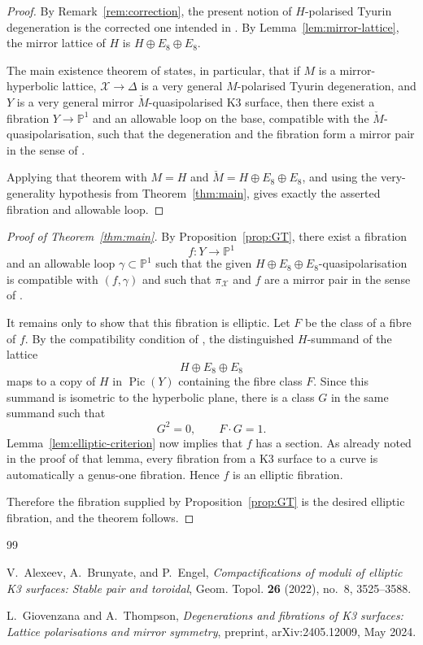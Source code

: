 \documentclass[11pt]{article}
\newcommand{\PP}{\mathbb{P}}
\newcommand{\Pic}{\operatorname{Pic}}
\begin{document}
\begin{proof}
By Remark~\ref{rem:correction}, the present notion of $H$-polarised Tyurin degeneration is the corrected one intended in \cite{GT24}. By Lemma~\ref{lem:mirror-lattice}, the mirror lattice of $H$ is $H\oplus E_8\oplus E_8$.

The main existence theorem of \cite[\S5]{GT24} states, in particular, that if $M$ is a mirror-hyperbolic lattice, $\mathcal X\to \Delta$ is a very general $M$-polarised Tyurin degeneration, and $Y$ is a very general mirror $\check M$-quasipolarised K3 surface, then there exist a fibration $Y\to \PP^1$ and an allowable loop on the base, compatible with the $\check M$-quasipolarisation, such that the degeneration and the fibration form a mirror pair in the sense of \cite[Definition~5.1]{GT24}.

Applying that theorem with $M=H$ and $\check M=H\oplus E_8\oplus E_8$, and using the very-generality hypothesis from Theorem~\ref{thm:main}, gives exactly the asserted fibration and allowable loop.
\end{proof}

\begin{proof}[Proof of Theorem~\ref{thm:main}]
By Proposition~\ref{prop:GT}, there exist a fibration
\[
f\colon Y\to \PP^1
\]
and an allowable loop $\gamma\subset \PP^1$ such that the given $H\oplus E_8\oplus E_8$-quasipolarisation is compatible with $(f,\gamma)$ and such that $\pi_{\mathcal X}$ and $f$ are a mirror pair in the sense of \cite[Definition~5.1]{GT24}.

It remains only to show that this fibration is elliptic. Let $F$ be the class of a fibre of $f$. By the compatibility condition of \cite[Definition~4.21]{GT24}, the distinguished $H$-summand of the lattice
\[
H\oplus E_8\oplus E_8
\]
maps to a copy of $H$ in $\Pic(Y)$ containing the fibre class $F$. Since this summand is isometric to the hyperbolic plane, there is a class $G$ in the same summand such that
\[
G^2=0,\qquad F\cdot G=1.
\]
Lemma~\ref{lem:elliptic-criterion} now implies that $f$ has a section. As already noted in the proof of that lemma, every fibration from a K3 surface to a curve is automatically a genus-one fibration. Hence $f$ is an elliptic fibration.

Therefore the fibration supplied by Proposition~\ref{prop:GT} is the desired elliptic fibration, and the theorem follows.
\end{proof}

\begin{thebibliography}{99}

V.~Alexeev, A.~Brunyate, and P.~Engel,
\emph{Compactifications of moduli of elliptic {K3} surfaces: Stable pair and toroidal},
Geom. Topol. \textbf{26} (2022), no.~8, 3525--3588.

L.~Giovenzana and A.~Thompson,
\emph{Degenerations and fibrations of {K3} surfaces: Lattice polarisations and mirror symmetry},
preprint, arXiv:2405.12009, May 2024.

\end{thebibliography}
\end{document}
